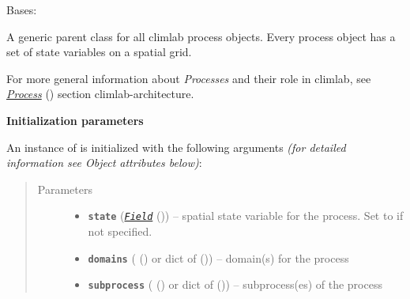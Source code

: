 \documentclass[a4paper,10pt,english]{sphinxmanual}
\begin{document}
\begin{fulllineitems}
\label{api/climlab.process:climlab.process.process.Process}
Bases: \href{http://docs.python.org/2.7/library/functions.html\#object}{}

A generic parent class for all climlab process objects.
Every process object has a set of state variables on a spatial grid.

For more general information about \emph{Processes} and their role in climlab,
see {\hyperref[architecture:process\string-architecture]{\emph{Process}}} () section climlab-architecture.

\textbf{Initialization parameters}

An instance of  is initialized with the following 
arguments \emph{(for detailed information see Object attributes below)}:
\begin{quote}\begin{description}
\item[{Parameters}] \leavevmode\begin{itemize}
\item {} 
\textbf{\texttt{state}} ({\hyperref[api/climlab.domain:climlab.domain.field.Field]{\emph{\emph{\texttt{Field}}}}} ()) -- spatial state variable for the process. 
Set to  if not specified.

\item {} 
\textbf{\texttt{domains}} ({\hyperref[api/climlab.domain:climlab.domain.domain._Domain]{\emph{}}} () or dict of 
{\hyperref[api/climlab.domain:climlab.domain.domain._Domain]{\emph{}}} ()) -- domain(s) for the process

\item {} 
\textbf{\texttt{subprocess}} ({\hyperref[api/climlab.process:climlab.process.process.Process]{\emph{}}} () or dict of 
{\hyperref[api/climlab.process:climlab.process.process.Process]{\emph{}}} ()) -- subprocess(es) of the process


\end{itemize}
\end{description}
\end{quote}
\end{fulllineitems}
\end{document}
